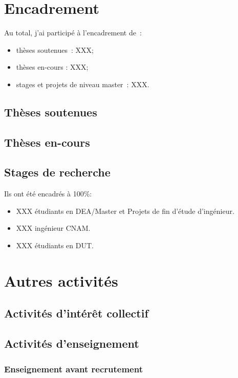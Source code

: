 \documentclass[french]{hdrapplication}
\begin{document}
\section{Encadrement}

Au total, j'ai participé à l'encadrement de~:
\begin{itemize}
\item thèses soutenues~: XXX;
\item thèses en-cours : XXX;
\item stages et projets de niveau master~: XXX.
\end{itemize}

\subsection{Thèses soutenues}

\subsection{Thèses en-cours}

\subsection{Stages de recherche}

Ils ont été encadrés à 100\%:
\begin{itemize}
\item XXX étudiants en DEA/Master et Projets de fin d'étude d'ingénieur.
\item XXX ingénieur CNAM.
\item XXX étudiants en DUT.
\end{itemize}

\section{Autres activités}

\subsection{Activités d'intérêt collectif}

\subsection{Activités d'enseignement}

\subsubsection{Enseignement avant recrutement}
\end{document}
